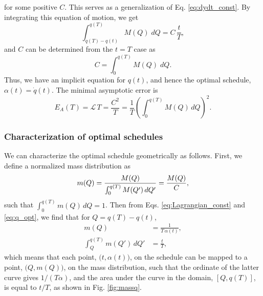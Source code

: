 \documentclass[reprint, superscriptaddress, floatfix]{revtex4-1}
\newcommand{\Err}{E}
\begin{document}
%
for some positive $C$.
%
This serves as a generalization of Eq. \eqref{eq:dydt_const}.
%
By integrating this equation of motion, we get
%
\begin{equation}
  \int_{ q(T) - q(t) }^{ q(T) }
    M(Q)
    \;
    d Q
  =
  C \, \frac t T
  ,
  \label{eq:q_opt}
\end{equation}
%
and $C$ can be determined from
the $t = T$ case as
%
\begin{equation}
  C =
  \int_{ 0 }^{ q(T) }
    M( Q )
    \;
    d Q
  .
  \label{eq:mint}
\end{equation}
%
Thus, we have an implicit equation for $q(t)$,
and hence the optimal schedule,
$\alpha(t) = \dot q(t)$.
%
The minimal asymptotic error is
%
\begin{equation}
  \Err_A(T)
  =
  \mathcal L \, T
  =
  \frac { C^2 } { T }
  =
  \frac 1 T
  \left(
    \int_0^{ q(T) } M(Q) \, dQ
  \right)^2
  .
\label{eq:error_asym2}
\end{equation}



\subsubsection{\label{sec:mass_distr}
Characterization of optimal schedules}



We can characterize the optimal schedule
geometrically as follows.
%
First, we define
a normalized mass distribution as
%
\begin{equation}
  m(Q)
  =
  \frac{
    M(Q)
  }
  {
    \int_0^{ q(T) } M(Q') \, d Q'
  }
  =
  \frac{
    M(Q)
  }
  {
    C
  }
  ,
\notag
\end{equation}
%
such that
$\int_0^{q(T)} m(Q) \, dQ = 1$.
%
Then from Eqs. \eqref{eq:Lagrangian_const} and \eqref{eq:q_opt},
we find that for $Q = q(T) - q(t)$,
%
\begin{align}
  m(Q)
  &=
  \frac{ 1 }
       { T \, \alpha(t) }
  ,
\label{eq:mQ_invTa}
  \\
  \int_Q^{ q(T) }
    m(Q') \, dQ'
  &=
  \frac t T
  ,
\label{eq:intmQ_tT}
\end{align}
%
which means that each point,
$\bigl(t, \alpha(t)\bigr)$,
on the schedule can be mapped
to a point,
$\bigl(Q, m(Q)\bigr)$,
on the mass distribution,
such that the ordinate of the latter curve
gives $1/(T\alpha)$,
and the area under the curve in the domain, $[Q, q(T)]$,
is equal to $t/T$,
as shown in Fig. \ref{fig:massq}.
%
\end{document}
